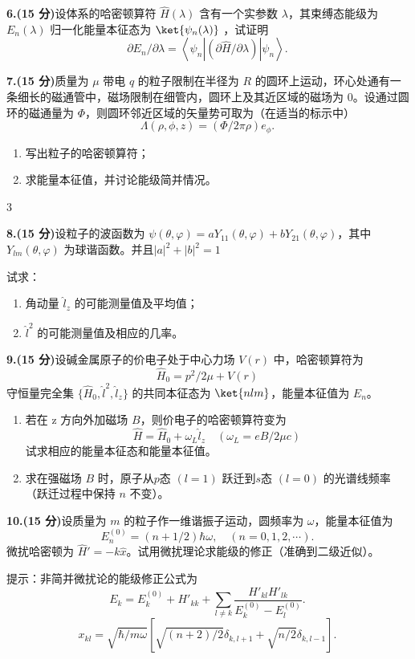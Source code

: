 \textbf{6.(15 分)}设体系的哈密顿算符 $\hat{H}(\lambda)$ 含有一个实参数 $\lambda$，其束缚态能级为 $E_n(\lambda)$ 归一化能量本征态为 $\ket{\psi_n(\lambda)}$ ，试证明
\[
\partial E_n/\partial \lambda = \left\langle \psi_n \left| (\partial \hat{H}/\partial \lambda) \right| \psi_n \right\rangle.~
\]

\textbf{7.(15 分)}质量为 $\mu$ 带电 $q$ 的粒子限制在半径为 $R$ 的圆环上运动，环心处通有一条细长的磁通管中，磁场限制在细管内，圆环上及其近区域的磁场为 $0$。设通过圆环的磁通量为 $\Phi$，则圆环邻近区域的矢量势可取为（在适当的标示中）
\[
\Lambda(\rho, \phi, z) = \left( \Phi/2\pi\rho \right) e_\phi.~
\]

\begin{enumerate}
    \item 写出粒子的哈密顿算符；
    \item 求能量本征值，并讨论能级简并情况。
\end{enumerate}3

\textbf{8.(15 分)}设粒子的波函数为 $\psi(\theta, \varphi) = aY_{11}(\theta, \varphi) + bY_{21}(\theta, \varphi)$，其中 $Y_{lm}(\theta, \varphi)$ 为球谐函数。并且$|a|^2 + |b|^2 = 1$

试求：
\begin{enumerate}
    \item  角动量 $\hat{l}_z$ 的可能测量值及平均值；
    \item  $\hat{l}^2$ 的可能测量值及相应的几率。
\end{enumerate}

\textbf{9.(15 分)}设碱金属原子的价电子处于中心力场 $V(r)$ 中，哈密顿算符为
\[
\hat{H}_0 =p^2/2\mu + V(r)~
\]
守恒量完全集 $\{\hat{H}_0, \hat{l}^2, \hat{l}_z\}$ 的共同本征态为 $\ket{nlm}$，能量本征值为 $E_n$。

\begin{enumerate}
    \item  若在 z 方向外加磁场 $B$，则价电子的哈密顿算符变为
    \[
    \hat{H} = \hat{H}_0 + \omega_L \hat{l}_z \quad (\omega_L = eB/2\mu c)~
    \]
    试求相应的能量本征态和能量本征值。

    \item  求在强磁场 $B$ 时，原子从$p$态 $(l = 1)$ 跃迁到$s$态 $(l = 0)$ 的光谱线频率（跃迁过程中保持 $n$ 不变）。
\end{enumerate}

\textbf{10.(15 分)}设质量为 $m$ 的粒子作一维谐振子运动，圆频率为 $\omega$，能量本征值为
\[
E_n^{(0)} = \left(n + 1/2\right)\hbar\omega, \quad (n = 0,1,2,\cdots).~
\]
微扰哈密顿为 $\hat{H}' = -k\hat{x}$。试用微扰理论求能级的修正（准确到二级近似）。

提示：非简并微扰论的能级修正公式为
\[
E_k = E_k^{(0)} + H'_{kk} + \sum_{l \neq k} \frac{H'_{kl} H'_{lk}}{E_k^{(0)} - E_l^{(0)}}.~
\]
\[
x_{kl} = \sqrt{\hbar/m\omega}\left[\sqrt{(n+2)/ 2}\delta_{k, l+1} + \sqrt{n/2}\delta_{k, l-1}\right].~
\]